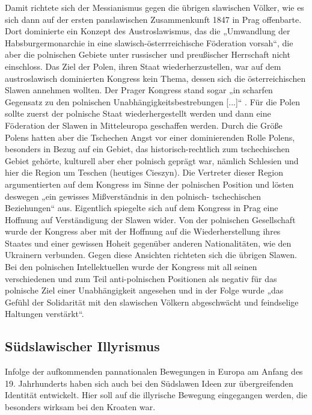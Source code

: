 \documentclass{../../sem_paper}
\begin{document}
Damit richtete sich der Messianismus gegen die übrigen slawischen Völker, wie es sich
dann auf der ersten panslawischen Zusammenkunft 1847 in Prag offenbarte. Dort dominierte
ein Konzept des Austroslawismus, das die „Umwandlung der Habsburgermonarchie in eine
slawisch-österrreichische Föderation vorsah“\autocite[103]{cetnarow}, die aber die
polnischen Gebiete unter russischer und preußischer Herrschaft nicht einschloss. Das Ziel der
Polen, ihren Staat wiederherzustellen, war auf dem austroslawisch dominierten Kongress kein
Thema, dessen sich die österreichischen Slawen annehmen wollten. Der Prager Kongress
stand sogar „in scharfen Gegensatz zu den polnischen Unabhängigkeitsbestrebungen [...]“\autocite[110]{cetnarow}
. Für die Polen sollte zuerst der polnische Staat wiederhergestellt
werden und dann eine Föderation der Slawen in Mitteleuropa geschaffen werden. Durch die
Größe Polens hatten aber die Tschechen Angst vor einer dominierenden Rolle Polens,
besonders in Bezug auf ein Gebiet, das historisch-rechtlich zum tschechischen Gebiet gehörte,
kulturell aber eher polnisch geprägt war, nämlich Schlesien und hier die Region um Teschen
(heutiges Cieszyn). Die Vertreter dieser Region argumentierten auf dem Kongress im Sinne
der polnischen Position und lösten deswegen „ein gewisses Mißverständnis in den polnisch-
tschechischen Beziehungen“\autocite[112]{cetnarow} aus. Eigentlich spiegelte sich auf dem
Kongress in Prag eine Hoffnung auf Verständigung der Slawen wider. Von der polnischen
Gesellschaft wurde der Kongress aber mit der Hoffnung auf die Wiederherstellung ihres
Staates und einer gewissen Hoheit gegenüber anderen Nationalitäten, wie den Ukrainern
verbunden. Gegen diese Ansichten richteten sich die übrigen Slawen. Bei den polnischen
Intellektuellen wurde der Kongress mit all seinen verschiedenen und zum Teil anti-polnischen
Positionen als negativ für das polnische Ziel einer Unabhängigkeit angesehen und in der
Folge wurde „das Gefühl der Solidarität mit den slawischen Völkern abgeschwächt und
feindselige Haltungen verstärkt“\autocite[114]{cetnarow}.

\subsection{Südslawischer Illyrismus}
Infolge der aufkommenden pannationalen Bewegungen in Europa am Anfang des 19.
Jahrhunderts haben sich auch bei den Südslawen Ideen zur übergreifenden Identität
entwickelt. Hier soll auf die illyrische Bewegung eingegangen werden, die besonders wirksam
bei den Kroaten war.
\end{document}

